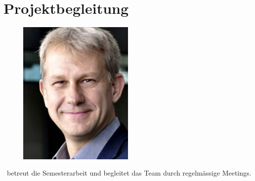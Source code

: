 	\section{Projektbegleitung}
	\begin{figure}[H]
		\begin{minipage}[b]{0.5\linewidth}
			\includegraphics[width=0.5\textwidth]{projectPlan/media/img/ozimmermann.jpg}
			\centering
			\caption{\teacher}
			\label{fig:olafzimmermann}
		\end{minipage}
	\end{figure}
	\teacher\ betreut die Semesterarbeit und begleitet das Team durch regelmässige Meetings.
